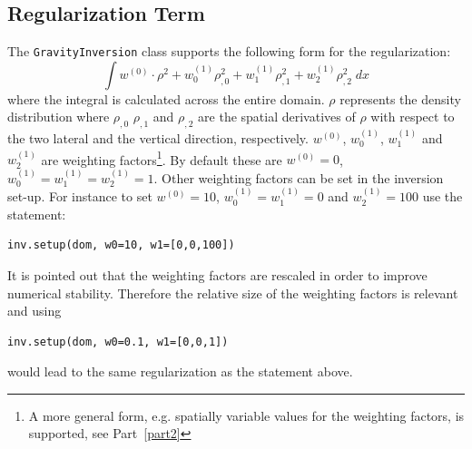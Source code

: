 \subsection{Regularization Term}\label{SEC:P1:GRAV:REMARK:REG}
The \verb|GravityInversion| class supports the following form for the
regularization:
\begin{equation}
\int w^{(0)} \cdot \rho^2 + w^{(1)}_0  \rho_{,0}^2 +  w^{(1)}_1  \rho_{,1}^2 +  w^{(1)}_2  \rho_{,2}^2\; dx   
\end{equation}
where the integral is calculated across the entire domain.
$\rho$ represents the density distribution where $\rho_{,0}$ $\rho_{,1}$ and
$\rho_{,2}$ are the spatial derivatives of $\rho$ with respect to the two
lateral and the vertical direction, respectively.
$w^{(0)}$, $w^{(1)}_0$, $w^{(1)}_1$ and $w^{(1)}_2$ are weighting
factors\footnote{A more general form, e.g. spatially variable values for the
weighting factors, is supported, see Part~\ref{part2}}.
By default these are $w^{(0)}=0$, $w^{(1)}_0=w^{(1)}_1=w^{(1)}_2=1$.
Other weighting factors can be set in the inversion set-up.
For instance to set $w^{(0)}=10$, $w^{(1)}_0=w^{(1)}_1=0$ and $w^{(1)}_2=100$
use the statement:
\begin{verbatim}
inv.setup(dom, w0=10, w1=[0,0,100])
\end{verbatim}
It is pointed out that the weighting factors are rescaled in order to improve
numerical stability. Therefore the relative size of the weighting factors is
relevant and using
\begin{verbatim}
inv.setup(dom, w0=0.1, w1=[0,0,1])
\end{verbatim}
would lead to the same regularization as the statement above.
